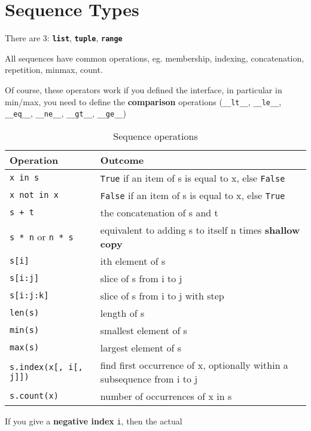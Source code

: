 \documentclass[10pt, openany]{article}
\begin{document}
  \section{Sequence Types}
  There are 3: \texttt{\textbf{list}}, 
  \texttt{\textbf{tuple}}, \texttt{\textbf{range}}\par

  All sequences have common operations, eg. membership, indexing, 
  concatenation, repetition, minmax, count.\par
  Of course, these operators work if you defined the interface, in
  particular in min/max, you need to define the \textbf{comparison}
  operations (\texttt{\_\_lt\_\_}, \texttt{\_\_le\_\_}, 
  \texttt{\_\_eq\_\_}, \texttt{\_\_ne\_\_}, \texttt{\_\_gt\_\_}, 
  \texttt{\_\_ge\_\_})
  \begin{table}[t]
    \centering
    \caption{Sequence operations}
    \begin{tabular}{@{}ll@{}}
      \toprule
      \textbf{Operation} & \textbf{Outcome} \\
      \midrule
      \texttt{x in s} & \texttt{True} if an item of s is equal to x,
        else \texttt{False} \\
      \texttt{x not in x} & \texttt{False} if an item of s is equal
        to x, else \texttt{True} \\
      \texttt{s + t} & the concatenation of s and t \\
      \texttt{s * n} or \texttt{n * s} & equivalent to adding s to
        itself n times \textbf{shallow copy}\\
      \texttt{s[i]} & ith element of s \\
      \texttt{s[i:j]} & slice of s from i to j \\
      \texttt{s[i:j:k]} & slice of s from i to j with step \\
      \texttt{len(s)} & length of s \\
      \texttt{min(s)} & smallest element of s \\
      \texttt{max(s)} & largest element of s \\
      \texttt{s.index(x[, i[, j]])} & find first occurrence of x,
        optionally within a subsequence from i to j \\
      \texttt{s.count(x)} & number of occurrences of x in s \\
      \bottomrule
    \end{tabular}
  \end{table}
  If you give a \textbf{negative index} \texttt{i}, then the actual
\end{document}

